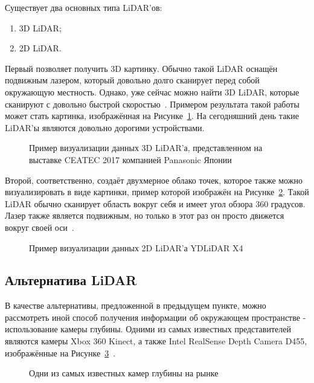 Существует два основных типа LiDAR'ов:

\begin{enumerate}[beginpenalty=10000] %
  \item 3D LiDAR;
  \item 2D LiDAR.
\end{enumerate}

Первый позволяет получить 3D картинку. Обычно такой LiDAR оснащён подвижным лазером, который довольно долго сканирует перед собой окружающую местность. Однако, уже сейчас можно найти 3D LiDAR, которые сканируют с довольно быстрой скоростью~\cite[с. 308]{lidar-3d}. Примером результата такой работы может стать картинка, изображённая на Рисунке~\cref{fig:lidar-3d}. На сегодняшний день такие LiDAR'ы являются довольно дорогими устройствами.

\begin{figure}[ht]
    \caption{Пример визуализации данных 3D LiDAR'а, представленном на выставке CEATEC 2017 компанией Panasonic Японии}\label{fig:lidar-3d}
\end{figure}

Второй, соответственно, создаёт двухмерное облако точек, которое также можно визуализировать в виде картинки, пример которой изображён на Рисунке~\cref{fig:lidar-2d}. Такой LiDAR обычно сканирует область вокруг себя и имеет угол обзора 360 градусов. Лазер также является подвижным, но только в этот раз он просто движется вокруг своей оси~\cite[с. 610]{lidar-2d}.

\begin{figure}[ht]
    \caption{Пример визуализации данных 2D LiDAR'а YDLiDAR X4}\label{fig:lidar-2d}
\end{figure}

\subsection{Альтернатива LiDAR}
В качестве альтернативы, предложенной в предыдущем пункте, можно рассмотреть иной способ получения информации об окружающем пространстве - использование камеры глубины. Одними из самых известных представителей являются камеры Xbox 360 Kinect, а также Intel RealSense Depth Camera D455, изображённые на Рисунке~\cref{fig:lidar-alts}~\cite{realsense,kinect-picture}.

\begin{figure}[ht]
    \legend{}
    \caption[Камеры глубины]{Одни из самых известных камер глубины на рынке}\label{fig:lidar-alts}
\end{figure}

